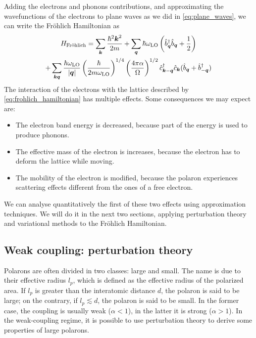 Adding the electrons and phonons contributions, and approximating the wavefunctions of the electrons to plane waves as we did in \cref{eq:plane_waves}, we can write the Fr\"{o}hlich Hamiltonian as
\begin{multline} \label{eq:frohlich_hamiltonian}
    H_\text{Fr\"{o}hlich} = \sum_{\mathbf{\boldsymbol{k}}} \frac{\hbar^2\mathbf{\boldsymbol{k}}^2}{2m}
    + \sum_{\mathbf{\boldsymbol{q}}} \hbar \omega_\text{LO} \left( \hat{b}^\dagger_{ \mathbf{\boldsymbol{q}}} \hat{b}_{ \mathbf{\boldsymbol{q}}} + \frac{1}{2} \right)
    \\ + \sum_{\mathbf{\boldsymbol{k}}\mathbf{\boldsymbol{q}}} \frac{\hbar \omega_\text{LO}}{|\mathbf{\boldsymbol{q}}|} \left(\frac{\hbar}{2m\omega_\text{LO}}\right)^{1/4} \left(\frac{4\pi\alpha}{\Omega}\right)^{1/2} \hat{c}^\dagger_{\mathbf{\boldsymbol{k}}-\mathbf{\boldsymbol{q}}}\hat{c}_{\mathbf{\boldsymbol{k}}} (\hat{b}_{\mathbf{\boldsymbol{q}}} + \hat{b}^\dagger_{-\mathbf{\boldsymbol{q}}})
\end{multline}
The interaction of the electrons with the lattice described by \cref{eq:frohlich_hamiltonian} has multiple effects. Some consequences we may expect are:
\begin{itemize}
    \item The electron band energy is decreased, because part of the energy is used to produce phonons.
    \item The effective mass of the electron is increases, because the electron has to deform the lattice while moving.
    \item The mobility of the electron is modified, because the polaron experiences scattering effects different from the ones of a free electron.
\end{itemize}
We can analyse quantitatively the first of these two effects using approximation techniques. We will do it in the next two sections, applying perturbation theory and variational methods to the Fr\"{o}hlich Hamiltonian.

\subsection{Weak coupling: perturbation theory} \label{sec:weak_frohlich}
Polarons are often divided in two classes: large and small. The name is due to their effective radius $l_p$, which is defined as the effective radius of the polarized area. If $l_p$ is greater than the interatomic distance $d$, the polaron is said to be large; on the contrary, if $l_p \lesssim d$, the polaron is said to be small. In the former case, the coupling is usually weak ($\alpha < 1$), in the latter it is strong ($\alpha > 1$). In the weak-coupling regime, it is possible to use perturbation theory to derive some properties of large polarons.

